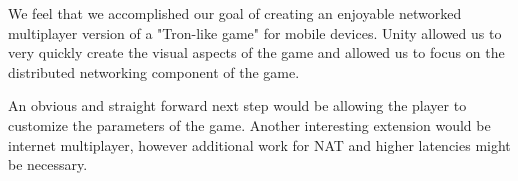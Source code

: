 \documentclass{report}
\begin{document}
 We feel that we accomplished our goal of creating an enjoyable  networked multiplayer version of a "Tron-like game" for mobile devices. Unity allowed us to very quickly create the visual aspects of the game and allowed us to focus on the distributed networking component of the game.

An obvious and straight forward next step would be allowing the  player to customize the parameters of the game. Another interesting extension would be internet multiplayer, however additional work for NAT and higher latencies might be necessary.

\balancecolumns %


\end{document}
